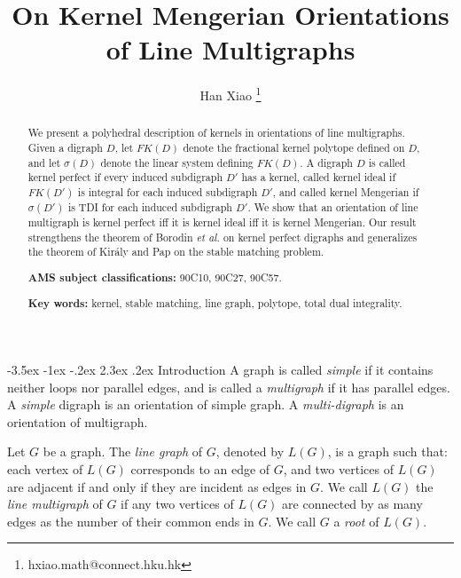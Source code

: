 \documentclass[11pt]{article}
\title{{\Large\bf  On Kernel Mengerian Orientations of Line Multigraphs}}
\date{}
\author{Han Xiao \footnote{hxiao.math@connect.hku.hk}}
\affil{Department of Mathematics,

The University of Hong Kong,

Hong Kong, China
}
\makeatletter
\numberwithin{theorem}{section}
\renewcommand\section{%
  \@startsection{section}{1}
                {\z@}%
                {-3.5ex \@plus -1ex \@minus -.2ex}%
                {2.3ex \@plus.2ex}%
                {\large\bfseries}%
}
\makeatother
\begin{document}

\maketitle

\jot

\hfill

\begin{abstract}
We present a polyhedral description of kernels in orientations of line multigraphs.
Given a digraph $D$, let $FK(D)$ denote the fractional kernel polytope defined on $D$,
and let $\sigma(D)$ denote the linear system defining $FK(D)$.
A digraph $D$ is
called kernel perfect if every induced subdigraph $D'$ has a kernel,
called kernel ideal if $FK(D')$ is integral for each induced subdigraph $D'$,
and called kernel Mengerian if $\sigma(D')$ is TDI for each induced subdigraph $D'$.
We show that an orientation of line multigraph is kernel perfect iff it is kernel ideal iff it is kernel Mengerian.
Our result strengthens the theorem of Borodin \textit{et al.} \cite{BoroKost98} on kernel perfect digraphs and generalizes the theorem of Kir\'{a}ly and Pap \cite{KiraPap08} on the stable matching problem.

\hfill

\hfill

\noindent\textbf{AMS subject classifications:} 90C10, 90C27, 90C57.


\noindent\textbf{Key words:} kernel, stable matching, line graph, polytope, total dual integrality.
\end{abstract}


\newpage
\section{Introduction}
\label{intro}
A graph is called \textit{simple} if it contains neither loops nor parallel edges, and is called a \textit{multigraph} if it has parallel edges.
A \textit{simple} digraph is an orientation of simple graph.
A \textit{multi-digraph} is an orientation of multigraph.

Let $G$ be a graph.
The \textit{line graph} of $G$, denoted by $L(G)$, is a graph such that: each vertex of $L(G)$ corresponds to an edge of $G$, and two vertices of $L(G)$ are adjacent if and only if they are incident as edges in $G$.
We call $L(G)$ the \textit{line multigraph} of $G$ if any two vertices of $L(G)$ are connected by as many edges as the number of their common ends in $G$.
We call $G$ a \textit{root} of $L(G)$.
\end{document}
